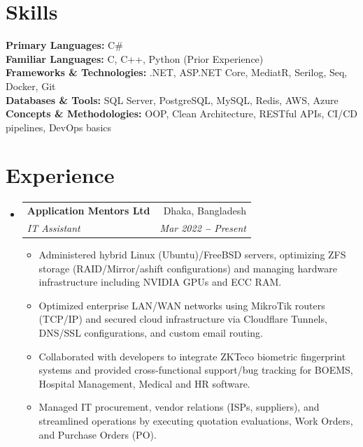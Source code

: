\documentclass[letterpaper,11pt]{article}
\makeatletter
\newcommand{\resumeItem}[1]{
  \item\small{
    {#1 \vspace{-2pt}}
  }
}
\newcommand{\resumeSubheading}[4]{
  \vspace{-2pt}\item
    \begin{tabular*}{0.97\textwidth}[t]{l@{\extracolsep{\fill}}r}
      \textbf{#1} & #2 \\
      \textit{\small#3} & \textit{\small #4} \\
    \end{tabular*}\vspace{-7pt}
}
\newcommand{\resumeSubHeadingListStart}{\begin{itemize}[leftmargin=0.15in, label={}]}
\newcommand{\resumeSubHeadingListEnd}{\end{itemize}}
\newcommand{\resumeItemListStart}{\begin{itemize}}
\newcommand{\resumeItemListEnd}{\end{itemize}\vspace{-5pt}}
\makeatother
\begin{document}
\section{Skills}
  \vspace{2pt}
  \resumeSubHeadingListStart
    \small{\item{
        \textbf{Primary Languages:} {C\#} \\ \vspace{4pt}
        \textbf{Familiar Languages:} {C, C++, Python (Prior Experience)} \\ \vspace{4pt}
        \textbf{Frameworks \& Technologies:} {.NET, ASP.NET Core, MediatR, Serilog, Seq, Docker, Git} \\ \vspace{4pt}
        \textbf{Databases \& Tools:} {SQL Server, PostgreSQL, MySQL, Redis, AWS, Azure} \\ \vspace{4pt}
        \textbf{Concepts \& Methodologies:} {OOP, Clean Architecture, RESTful APIs, CI/CD pipelines, DevOps basics}
    }}
  \resumeSubHeadingListEnd


\section{Experience}
  \vspace{3pt}
  \resumeSubHeadingListStart

    \resumeSubheading
      {Application Mentors Ltd}{Dhaka, Bangladesh}
      {IT Assistant}{Mar 2022 \textbf{--} Present}
      \resumeItemListStart
          \resumeItem{Administered hybrid Linux (Ubuntu)/FreeBSD servers, optimizing ZFS storage (RAID/Mirror/ashift configurations) and managing hardware infrastructure including NVIDIA GPUs and ECC RAM.}
          \resumeItem{Optimized enterprise LAN/WAN networks using MikroTik routers (TCP/IP) and secured cloud infrastructure via Cloudflare Tunnels, DNS/SSL configurations, and custom email routing.}
          \resumeItem{Collaborated with developers to integrate ZKTeco biometric fingerprint systems and provided cross-functional support/bug tracking for BOEMS, Hospital Management, Medical and HR software.}
          \resumeItem{Managed IT procurement, vendor relations (ISPs, suppliers), and streamlined operations by executing quotation evaluations, Work Orders, and Purchase Orders (PO).}
      \resumeItemListEnd
    
  \resumeSubHeadingListEnd
\end{document}
